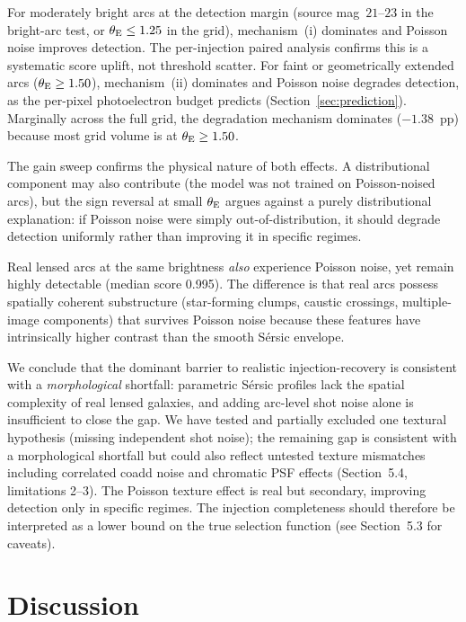 \documentclass[fleqn,usenatbib]{mnras}
\begin{document}
For moderately bright arcs at the detection margin (source mag~$21$--$23$ in the bright-arc test, or $\theta_{\rm E} \leq 1.25$ in the grid), mechanism~(i) dominates and Poisson noise improves detection.  The per-injection paired analysis confirms this is a systematic score uplift, not threshold scatter.  For faint or geometrically extended arcs ($\theta_{\rm E} \geq 1.50$), mechanism~(ii) dominates and Poisson noise degrades detection, as the per-pixel photoelectron budget predicts (Section~\ref{sec:prediction}).  Marginally across the full grid, the degradation mechanism dominates ($-1.38$~pp) because most grid volume is at $\theta_{\rm E} \geq 1.50$.

The gain sweep confirms the physical nature of both effects.  A distributional component may also contribute (the model was not trained on Poisson-noised arcs), but the sign reversal at small $\theta_{\rm E}$ argues against a purely distributional explanation: if Poisson noise were simply out-of-distribution, it should degrade detection uniformly rather than improving it in specific regimes.

Real lensed arcs at the same brightness \emph{also} experience Poisson noise, yet remain highly detectable (median score 0.995).  The difference is that real arcs possess spatially coherent substructure (star-forming clumps, caustic crossings, multiple-image components) that survives Poisson noise because these features have intrinsically higher contrast than the smooth S\'{e}rsic envelope.

We conclude that the dominant barrier to realistic injection-recovery is consistent with a \emph{morphological} shortfall: parametric S\'{e}rsic profiles lack the spatial complexity of real lensed galaxies, and adding arc-level shot noise alone is insufficient to close the gap.  We have tested and partially excluded one textural hypothesis (missing independent shot noise); the remaining gap is consistent with a morphological shortfall but could also reflect untested texture mismatches including correlated coadd noise and chromatic PSF effects (Section~5.4, limitations 2--3).  The Poisson texture effect is real but secondary, improving detection only in specific regimes.  The injection completeness should therefore be interpreted as a lower bound on the true selection function (see Section~5.3 for caveats).


\section{Discussion}
\end{document}
